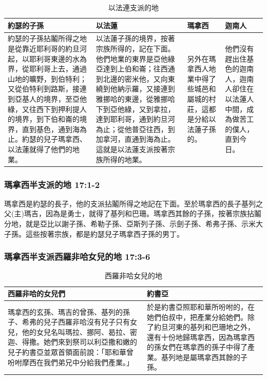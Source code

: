 \begin{table}[H]
\centering
\begin{tabular}{p{}|p{}|p{}|p{}}\hline\hline
約瑟的子孫&以法蓮&瑪拿西&迦南人\\\hline
約瑟的子孫拈鬮所得之地是從靠近耶利哥的約旦河起，以耶利哥東邊的水為界，從耶利哥上去，通過山地的曠野，到伯特利；又從伯特利到路斯，接連到亞基人的境界，至亞他綠，又往西下到押利提人的境界，到下伯和崙的境界，直到基色，通到海為止。約瑟的兒子瑪拿西、以法蓮就得了他們的地業。&以法蓮子孫的境界，按著宗族所得的，記在下面。他們地業的東界是亞他綠亞達到上伯和崙；往西通到北邊的密米他，又向東繞到他納示羅，又接連到雅挪哈的東邊，從雅挪哈下到亞他綠，又到拿拉，達到耶利哥，通到約旦河為止；從他普亞往西，到加拿河，直通到海為止。這就是以法蓮支派按著宗族所得的地業。&另外在瑪拿西人地業中得了些城邑和屬城的村莊，這都是分給以法蓮子孫的。&他們沒有趕出住基色的迦南人，迦南人卻住在以法蓮人中間，成為做苦工的僕人，直到今日。\\\hline
 \end{tabular}
\caption{以法連支派的地}
\end{table}


\subsubsection{瑪拿西半支派的地 17:1-2}
瑪拿西是約瑟的長子，他的支派拈鬮所得之地記在下面。至於瑪拿西的長子基列之父(主)瑪吉，因為是勇士，就得了基列和巴珊。瑪拿西其餘的子孫，按著宗族拈鬮分地，就是亞比以謝子孫、希勒子孫、亞斯列子孫、示劍子孫、希弗子孫、示米大子孫。這些按著宗族，都是約瑟兒子瑪拿西子孫的男丁。

\subsubsection{瑪拿西半支派西羅非哈女兒的地 17:3-6}
\begin{table}[H]
\centering
\begin{tabular}{p{9.3cm}|p{}}\hline\hline
西羅非哈的女兒們&約書亞\\\hline
瑪拿西的玄孫、瑪吉的曾孫、基列的孫子、希弗的兒子西羅非哈沒有兒子只有女兒，他的女兒名叫瑪拉、挪阿、曷拉、密迦、得撒。她們來到祭司以利亞撒和嫩的兒子約書亞並眾首領面前說：「耶和華曾吩咐摩西在我們弟兄中分給我們產業。」 &於是約書亞照耶和華所吩咐的，在她們伯叔中，把產業分給她們。除了約旦河東的基列和巴珊地之外，還有十份地歸瑪拿西，因為瑪拿西的孫女們在瑪拿西的孫子中得了產業。基列地是屬瑪拿西其餘的子孫。\\\hline
 \end{tabular}
\caption{西羅非哈女兒的地 }
\end{table}


